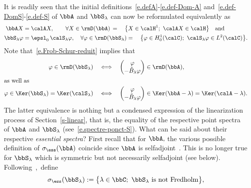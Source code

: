 It is readily seen that the initial definitions~\eqref{e.defA}-\eqref{e.def-Dom-A} and~\eqref{e.def-DomS}-\eqref{e.def-S} of $\bbA$ and $\bbS_\lambda$ can now be reformulated equivalently as
\begin{align*}
 \bbA X &= \calA X, \qquad
\forall X \in \rmD(\bbA) \,=\quad\big\{ X \in \calH^{1};\ \calA X \in \calH \big\} \quad\text{and} \\
 \bbS_\lambda \varphi &= \epsl_0\,\calS_\lambda \varphi, \quad
\forall \varphi \in \rmD(\bbS_\lambda) =\quad\big\{ \varphi \in H^1_0(\calC);\ \calS_\lambda \varphi \in L^2(\calC) \big\}.
\end{align*}
Note that~\eqref{e.Frob-Schur-reduit} implies that
\begin{align}
\varphi \in \rmD(\bbS_\lambda)\quad &\Longleftrightarrow\quad
\begin{pmatrix} \varphi \\ -\check{B}_\lambda \varphi
\end{pmatrix} \in \rmD(\bbA),\label{e.equiv-Dom}\\
\intertext{as well as}
\varphi \in \Ker(\bbS_\lambda) = \Ker(\calS_\lambda) \quad &\Longleftrightarrow\quad
\begin{pmatrix} \varphi \\ -\check{B}_\lambda \varphi
\end{pmatrix} \in \Ker(\bbA - \lambda) = \Ker(\calA - \lambda).\label{e.rel-Ker}
\end{align}
The latter equivalence is nothing but a condensed expression of the linearization process of Section~\ref{s-linear}, that is, the equality of the respective point spectra of $\bbA$ and $\bbS_\lambda$ (see~\eqref{e.spectre-ponct-S}). What can be said about their respective \emph{essential spectra}? First recall that for $\bbA,$ the various possible definition of $\sigma_{\ess}(\bbA)$ coincide since $\bbA$ is selfadjoint~\cite[Theorem~1.6, p.~417]{Edm-Eva-87}. This is no longer true for $\bbS_\lambda$ which is symmetric but not necessarily selfadjoint (see below). Following~\cite[Section~2.4]{Tre-08},~define
\[
\sigma_{\ess}(\bbS_\lambda) := \big\{ \lambda \in \bbC;\ \bbS_\lambda \text{ is not Fredholm} \big\},
\]
